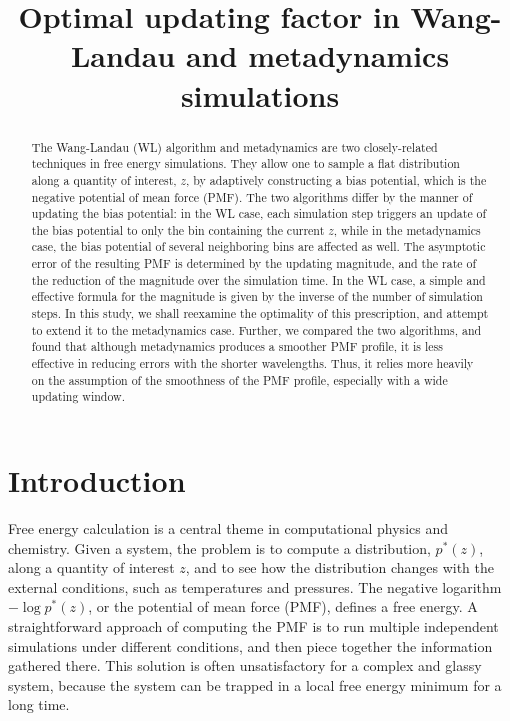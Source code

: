 \documentclass[reprint]{revtex4-1}
\begin{document}
\title{Optimal updating factor in Wang-Landau and metadynamics simulations}



\begin{abstract}
  The Wang-Landau (WL) algorithm and metadynamics
  are two closely-related techniques in free energy simulations.
  They allow one to sample a flat distribution
  along a quantity of interest, $z$,
  by adaptively constructing a bias potential,
  which is the negative potential of mean force (PMF).
  The two algorithms differ by
  the manner of updating the bias potential:
  in the WL case, each simulation step triggers
  an update of the bias potential to only
  the bin containing the current $z$,
  while in the metadynamics case,
  the bias potential of several neighboring bins
  are affected as well.
  The asymptotic error of the resulting PMF
  is determined by the updating magnitude,
  and the rate of the reduction of the magnitude
  over the simulation time.
  In the WL case,
  a simple and effective formula for the magnitude
  is given by the inverse of the number of simulation steps.
  In this study, we shall reexamine the optimality of this prescription,
  and attempt to extend it to the metadynamics case.
  Further, we compared the two algorithms, and found that
  although metadynamics produces a smoother PMF profile,
  it is less effective in reducing errors with the shorter wavelengths.
  Thus, it relies more heavily on the assumption of
  the smoothness of the PMF profile,
  especially with a wide updating window.
\end{abstract}

\maketitle



\section{Introduction}



Free energy calculation\cite{frenkel} is a central theme
in computational physics and chemistry.
%
Given a system,
the problem is to compute a distribution, $p^*(z)$,
along a quantity of interest $z$, and to see how
the distribution changes with the external conditions,
such as temperatures and pressures.
%
The negative logarithm $-\log p^*(z)$,
or the potential of mean force (PMF),
defines a free energy.
%
A straightforward approach of computing the PMF
is to run multiple independent simulations
under different conditions,
and then piece together the information
gathered there.
%
This solution is often unsatisfactory
for a complex and glassy system,
because the system can be trapped
in a local free energy minimum
for a long time.
\end{document}
